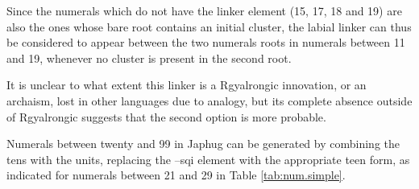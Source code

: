\documentclass[oldfontcommands,oneside,a4paper,12pt]{article}
\newcommand{\ipa}[1]{{\phon#1}}
\begin{document}
Since the numerals which do not have the linker element (15, 17, 18 and 19) are also the ones whose bare root contains an initial cluster, the labial linker can thus be considered to appear between the two numerals roots in numerals between 11 and 19, whenever no cluster is present in the second root.
 
It is unclear to what extent this linker is a Rgyalrongic innovation, or an archaism, lost in other languages due to  analogy, but its complete absence outside of Rgyalrongic suggests that the second option is more probable.


Numerals between  twenty  and 99 in Japhug can be generated by combining the tens with the units, replacing the \ipa{--sqi} element with the appropriate teen form, as indicated for numerals between 21 and 29 in Table \ref{tab:num.simple}.
\end{document}
